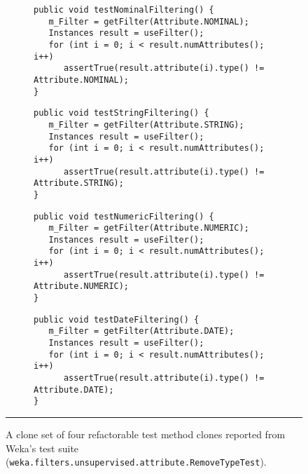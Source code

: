 \begin{figure}[ht!]
\begin{subfigure}[b]{\columnwidth}
\begin{lstlisting}
public void testNominalFiltering() {
   m_Filter = getFilter(Attribute.NOMINAL);
   Instances result = useFilter();
   for (int i = 0; i < result.numAttributes(); i++)
      assertTrue(result.attribute(i).type() != Attribute.NOMINAL);
}
\end{lstlisting}
\end{subfigure}

\begin{subfigure}[b]{\columnwidth}
\begin{lstlisting}
public void testStringFiltering() {
   m_Filter = getFilter(Attribute.STRING);
   Instances result = useFilter();
   for (int i = 0; i < result.numAttributes(); i++)
      assertTrue(result.attribute(i).type() != Attribute.STRING);
}
\end{lstlisting}
\end{subfigure}

\begin{subfigure}[b]{\columnwidth}
\begin{lstlisting}
public void testNumericFiltering() {
   m_Filter = getFilter(Attribute.NUMERIC);
   Instances result = useFilter();
   for (int i = 0; i < result.numAttributes(); i++)
      assertTrue(result.attribute(i).type() != Attribute.NUMERIC);
}
\end{lstlisting}
\end{subfigure}

\begin{subfigure}[b]{\columnwidth}
\begin{lstlisting}
public void testDateFiltering() {
   m_Filter = getFilter(Attribute.DATE);
   Instances result = useFilter();
   for (int i = 0; i < result.numAttributes(); i++)
      assertTrue(result.attribute(i).type() != Attribute.DATE);
}
\end{lstlisting}
\end{subfigure}

   \hrule
   \caption
   {\label{fig:motivating_code}
   A clone set of four refactorable test method clones reported from Weka's test suite
   ({\tt weka.filters.unsupervised.attribute.RemoveTypeTest}).}
\end{figure}

